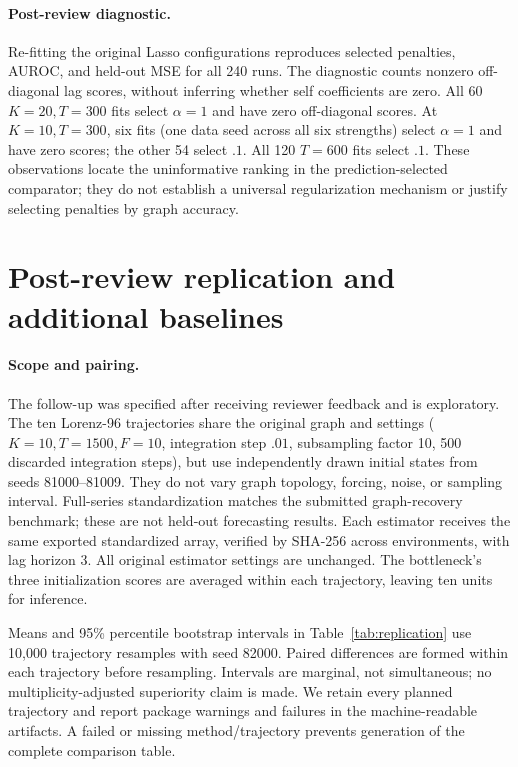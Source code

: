 \paragraph{Post-review diagnostic.}
Re-fitting the original Lasso configurations reproduces selected penalties,
AUROC, and held-out MSE for all 240 runs. The diagnostic counts nonzero
off-diagonal lag scores, without inferring whether self coefficients are
zero. All 60 $K=20,T=300$ fits select $\alpha=1$ and have zero off-diagonal
scores. At $K=10,T=300$, six fits (one data seed across all six strengths)
select $\alpha=1$ and have zero scores; the other 54 select $.1$. All 120
$T=600$ fits select $.1$. These observations locate the uninformative ranking
in the prediction-selected comparator; they do not establish a universal
regularization mechanism or justify selecting penalties by graph accuracy.

\section{Post-review replication and additional baselines}
\label{app:followup}

\paragraph{Scope and pairing.}
The follow-up was specified after receiving reviewer feedback and is
exploratory. The ten Lorenz-96 trajectories share the original graph and
settings ($K=10,T=1500,F=10$, integration step $.01$, subsampling factor 10,
500 discarded integration steps), but use independently drawn initial states
from seeds 81000--81009. They do not vary graph topology, forcing, noise,
or sampling interval. Full-series standardization matches the submitted
graph-recovery benchmark; these are not held-out forecasting results.
Each estimator receives the same exported standardized array, verified by
SHA-256 across environments, with lag horizon 3. All original estimator
settings are unchanged. The bottleneck's three initialization scores are
averaged within each trajectory, leaving ten units for inference.

Means and 95\% percentile bootstrap intervals in Table~\ref{tab:replication}
use 10,000 trajectory resamples with seed 82000. Paired differences are
formed within each trajectory before resampling. Intervals are marginal,
not simultaneous; no multiplicity-adjusted superiority claim is made.
We retain every planned trajectory and report package warnings and failures
in the machine-readable artifacts. A failed or missing method/trajectory
prevents generation of the complete comparison table.

